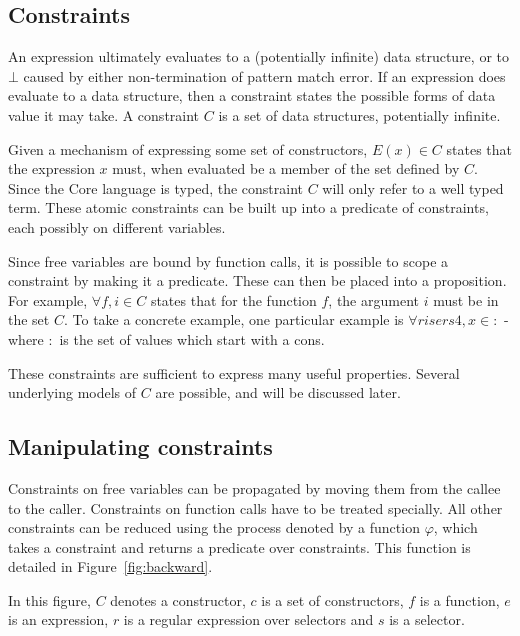 \documentclass[preprint]{sigplanconf}
\begin{document}
\subsection{Constraints}

An expression ultimately evaluates to a (potentially infinite) data structure, or to $\bot{}$ caused by either non-termination of pattern match error. If an expression does evaluate to a data structure, then a constraint states the possible forms of data value it may take. A constraint $C$ is a set of data structures, potentially infinite.

Given a mechanism of expressing some set of constructors, $E(x) \in C$ states that the expression $x$ must, when evaluated be a member of the set defined by $C$. Since the Core language is typed, the constraint $C$ will only refer to a well typed term. These atomic constraints can be built up into a predicate of constraints, each possibly on different variables.

Since free variables are bound by function calls, it is possible to scope a constraint by making it a predicate. These can then be placed into a proposition. For example, $\forall f, i \in C$ states that for the function $f$, the argument $i$ must be in the set $C$. To take a concrete example, one particular example is $\forall risers4, x \in {:}$ - where ${:}$ is the set of values which start with a cons.

These constraints are sufficient to express many useful properties. Several underlying models of $C$ are possible, and will be discussed later.

\subsection{Manipulating constraints}

Constraints on free variables can be propagated by moving them from the callee to the caller. Constraints on function calls have to be treated specially. All other constraints can be reduced using the process denoted by a function $\varphi$, which takes a constraint and returns a predicate over constraints.
This function is detailed in Figure~\ref{fig:backward}.

In this figure, $C$ denotes a constructor, $c$ is a set of
constructors, $f$ is a function, $e$ is an expression, $r$ is a
regular expression over selectors and $s$ is a selector.
\end{document}
